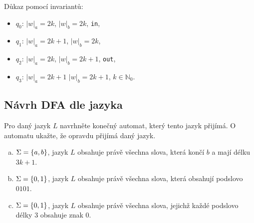 \begin{multicols}{2}


    Důkaz pomocí invariantů:
    \begin{itemize}[noitemsep]
        \item $q_0$: $|w|_a = 2k$, $|w|_b = 2k$, \texttt{in},
        \item $q_1$: $|w|_a = 2k + 1$, $|w|_b = 2k$,
        \item $q_2$: $|w|_a = 2k$, $|w|_b = 2k + 1$, \texttt{out},
        \item $q_3$: $|w|_a = 2k + 1$ $|w|_b = 2k+ 1$, $k \in \mathbb{N}_0$.
    \end{itemize}
\end{multicols}

\subsection{Návrh DFA dle jazyka}
Pro daný jazyk $L$ navrhněte konečný automat, který tento jazyk přijímá. O automatu ukažte, že opravdu přijímá daný jazyk.

\begin{enumerate}[a), noitemsep]
    \item $\Sigma = \left\lbrace a,b \right\rbrace$, jazyk $L$ obsahuje právě všechna slova, která končí $b$ a mají délku $3k+1$.
    \item $\Sigma = \left\lbrace 0,1 \right\rbrace$, jazyk $L$ obsahuje právě všechna slova, která obsahují podslovo $0101$.
    \item $\Sigma = \left\lbrace 0,1 \right\rbrace$, jazyk $L$ obsahuje právě všechna slova, jejichž každé podslovo délky $3$ obsahuje znak $0$.
\end{enumerate}

